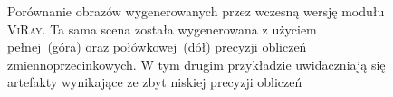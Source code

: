 \begin{enumerate}
\begin{figure}[H]
\centering
{}
\caption[Porównanie obrazów wygenerowanych przez wczesną wersję modułu \textsc{ViRay}]{Porównanie obrazów wygenerowanych przez wczesną wersję modułu \textsc{ViRay}. Ta sama scena została wygenerowana z użyciem pełnej~(góra) oraz połówkowej~(dół) precyzji obliczeń zmiennoprzecinkowych. W tym drugim przykładzie uwidaczniają się artefakty wynikające ze zbyt niskiej precyzji obliczeń}
\label{ch3:img:float_vs_half}
\end{figure}
\end{enumerate}

